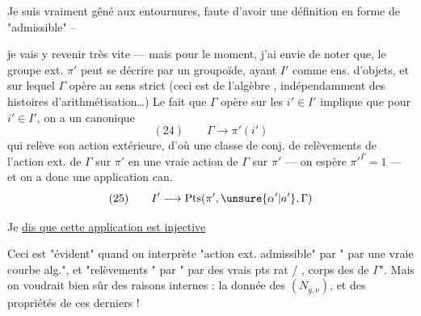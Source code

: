 
 Je suis vraiment gêné
aux entournures, faute d'avoir une
définition en forme de "admissible" --



je vais y revenir très vite --- mais
pour le moment, j'ai envie de noter que,
le groupe ext. $\pi'$ peut se décrire par
un  groupoïde, ayant $I'$ comme ens.
d'objets, et sur lequel $\Gamma$ opère au
sens strict (ceci est de l'algèbre ,
indépendamment des histoires d'arithmétisation\ldots)
Le fait que $\Gamma$ opère 
sur les $i'\in I'$ implique que pour 
$i'\in I'$, on a un 
 canonique
\[
(24)\qquad \Gamma\longrightarrow\pi'(i')
\]
qui relève son action extérieure, d'où
une  classe de conj. de relèvements
de l'action ext. de $\Gamma$ sur $\pi'$
en une vraie action de $\Gamma$ sur $\pi'$
--- on espère   ${\pi'}^{\Gamma}=1$ ---
et on a donc une application can.
\[
(25)\qquad I'\longrightarrow\mathrm{Pts}(\pi',\unsure{\alpha'|a'},\Gamma)
\]



Je \uline{dis que cette application est injective}

Ceci est "évident" quand on interprète
"action ext. admissible" par "
par une vraie courbe alg.", et
"relèvements " par "
par des vrais pts rat / , corps des
 de $\Gamma$". Mais on voudrait
bien sûr des raisons internes :
la donnée des $(N_{g,\nu})$, et des \unsure{)}
propriétés de ces derniers ! 


